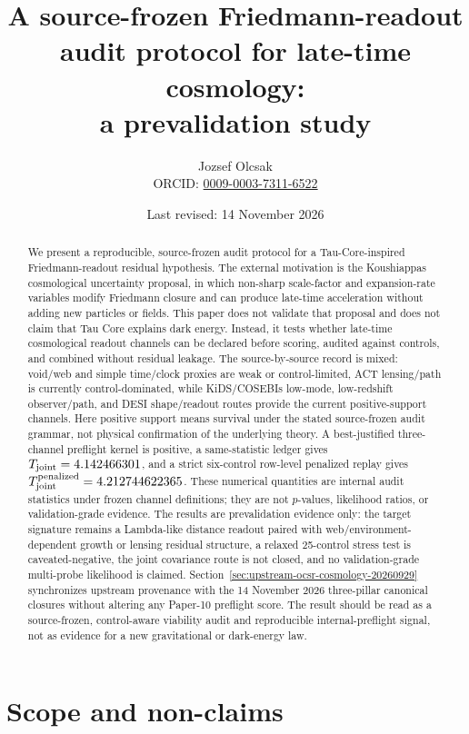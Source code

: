 \documentclass[11pt]{article}
\title{A source-frozen Friedmann-readout audit protocol for late-time cosmology:\\
a prevalidation study}
\author{Jozsef Olcsak\\{\small ORCID: \href{https://orcid.org/0009-0003-7311-6522}{0009-0003-7311-6522}}}
\date{Last revised: 14 November 2026}
\begin{document}
\maketitle

\begin{abstract}
We present a reproducible, source-frozen audit protocol for a
Tau-Core-inspired Friedmann-readout residual hypothesis.  The external
motivation is the Koushiappas cosmological uncertainty proposal, in which
non-sharp scale-factor and expansion-rate variables modify Friedmann closure
and can produce late-time acceleration without adding new particles or fields.
This paper does not validate that proposal and does not claim that Tau Core
explains dark energy.  Instead, it tests whether late-time cosmological
readout channels can be declared before scoring, audited against controls, and
combined without residual leakage.  The source-by-source record is mixed:
void/web and simple time/clock proxies are weak or control-limited, ACT
lensing/path is currently control-dominated, while KiDS/COSEBIs low-mode,
low-redshift observer/path, and DESI shape/readout routes provide the current
positive-support channels.  Here positive support means survival under the
stated source-frozen audit grammar, not physical confirmation of the underlying
theory.  A best-justified three-channel preflight kernel is positive, a
same-statistic ledger gives \(T_{\rm joint}=4.142466301\), and a strict
six-control row-level penalized replay gives
\(T_{\rm joint}^{\rm penalized}=4.212744622365\).  These numerical quantities
are internal audit statistics under frozen channel definitions; they are not
\(p\)-values, likelihood ratios, or validation-grade evidence.  The results are
prevalidation evidence only: the target signature remains a Lambda-like
distance readout paired with web/environment-dependent growth or lensing residual
structure, a relaxed 25-control stress test is
caveated-negative, the joint covariance route is not closed, and no
validation-grade multi-probe likelihood is claimed.  Section~\ref{sec:upstream-ocsr-cosmology-20260929}
synchronizes upstream provenance with the 14 November 2026 three-pillar
canonical closures without altering any Paper-10 preflight score.  The result
should be read as a source-frozen, control-aware viability audit and
reproducible internal-preflight signal, not as evidence for a new gravitational
or dark-energy law.
\end{abstract}

\section{Scope and non-claims}
\end{document}
